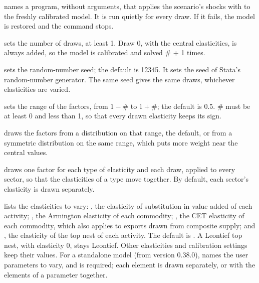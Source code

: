 \begin{optdesc}
\item[\optarg{scen}{ario}{program}] names a program, without arguments, that
applies the scenario's shocks with  to the freshly
calibrated model. It is run quietly for every draw. If it fails, the model is
restored and the command stops.

\item[\optarg{draw}{s}{\#}] sets the number of draws, at least 1. Draw 0, with
the central elasticities, is always added, so the model is calibrated and
solved \# + 1 times.

\item[\optarg{}{seed}{\#}] sets the random-number seed; the default is 12345.
It sets the seed of Stata's random-number generator. The same seed gives the
same draws, whichever elasticities are varied.

\item[\optarg{spr}{ead}{\#}] sets the range of the factors, from $1 - \#$ to
$1 + \#$; the default is 0.5. \# must be at least 0 and less than 1, so
that every drawn elasticity keeps its sign.

\item[\optarg{dist}{ribution}{name}] draws the factors from a
 distribution on that range, the default, or from a symmetric
 distribution on the same range, which puts more weight near
the central values.

\item[\opt{}{common}] draws one factor for each type of elasticity and each
draw, applied to every sector, so that the elasticities of a type move
together. By default, each sector's elasticity is drawn separately.

\item[\optarg{var}{y}{list}] lists the elasticities to vary: , the
elasticity of substitution in value added of each activity; , the
Armington elasticity of each commodity; , the CET elasticity of each
commodity, which also applies to exports drawn from composite supply; and
, the elasticity of the top nest of each activity. The default is
. A Leontief top nest, with elasticity 0, stays Leontief. Other
elasticities and calibration settings keep their values. For a standalone
model (from version 0.38.0),  names the user parameters to
vary, and is required; each element is drawn separately, or with
 the elements of a parameter together.


\end{optdesc}

